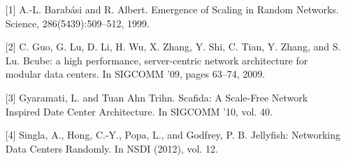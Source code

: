 \begin{itemize}[leftmargin=0pt]
       \item[] [1] A.-L. Barabási and R. Albert. Emergence of Scaling in Random Networks. Science, 286(5439):509–512, 1999.
       \vspace{4pt}
       \item[] [2] C. Guo, G. Lu, D. Li, H. Wu, X. Zhang, Y. Shi, C. Tian, Y. Zhang, and S. Lu. Bcube: a high performance, server-centric network architecture for modular data centers. In SIGCOMM ’09, pages 63–74, 2009.
       \vspace{4pt}
  \item[] [3] Gyaramati, L. and Tuan Ahn Trihn. Scafida: A Scale-Free Network Inspired Date Center Architecture. In SIGCOMM '10, vol. 40.
  \vspace{4pt}
  \item[] [4] Singla, A., Hong, C.-Y., Popa, L., and Godfrey, P. B. Jellyfish: Networking Data Centers Randomly. In NSDI (2012), vol. 12.
    \end{itemize}

